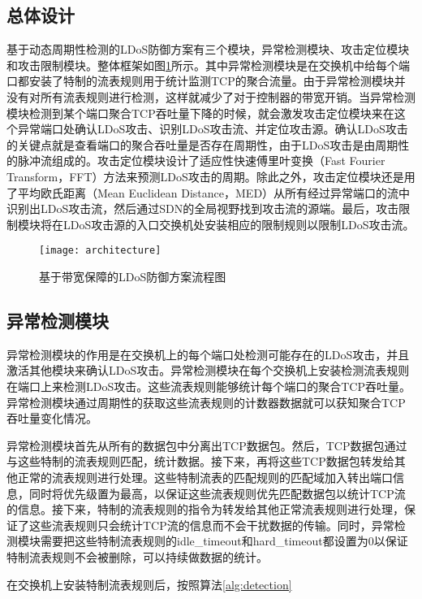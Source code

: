 \subsection{总体设计}
\label{chap4:overview}

基于动态周期性检测的LDoS防御方案有三个模块，异常检测模块、攻击定位模块和攻击限制模块。整体框架如图\ref{fig:architecture}所示。其中异常检测模块是在交换机中给每个端口都安装了特制的流表规则用于统计监测TCP的聚合流量。由于异常检测模块并没有对所有流表规则进行检测，这样就减少了对于控制器的带宽开销。当异常检测模块检测到某个端口聚合TCP吞吐量下降的时候，就会激发攻击定位模块来在这个异常端口处确认LDoS攻击、识别LDoS攻击流、并定位攻击源。确认LDoS攻击的关键点就是查看端口的聚合吞吐量是否存在周期性，由于LDoS攻击是由周期性的脉冲流组成的。攻击定位模块设计了适应性快速傅里叶变换（Fast Fourier Transform，FFT）方法来预测LDoS攻击的周期。除此之外，攻击定位模块还是用了平均欧氏距离（Mean Euclidean Distance，MED）从所有经过异常端口的流中识别出LDoS攻击流，然后通过SDN的全局视野找到攻击流的源端。最后，攻击限制模块将在LDoS攻击源的入口交换机处安装相应的限制规则以限制LDoS攻击流。

\begin{figure}
    \centering
    \texttt{[image: architecture]}
    \caption{基于带宽保障的LDoS防御方案流程图}
    \label{fig:architecture}
\end{figure}

\subsection{异常检测模块}
\label{chap4:Monitor}
异常检测模块的作用是在交换机上的每个端口处检测可能存在的LDoS攻击，并且激活其他模块来确认LDoS攻击。异常检测模块在每个交换机上安装检测流表规则在端口上来检测LDoS攻击。这些流表规则能够统计每个端口的聚合TCP吞吐量。异常检测模块通过周期性的获取这些流表规则的计数器数据就可以获知聚合TCP吞吐量变化情况。

异常检测模块首先从所有的数据包中分离出TCP数据包。然后，TCP数据包通过与这些特制的流表规则匹配，统计数据。接下来，再将这些TCP数据包转发给其他正常的流表规则进行处理。这些特制流表的匹配规则的匹配域加入转出端口信息，同时将优先级置为最高，以保证这些流表规则优先匹配数据包以统计TCP流的信息。接下来，特制的流表规则的指令为转发给其他正常流表规则进行处理，保证了这些流表规则只会统计TCP流的信息而不会干扰数据的传输。同时，异常检测模块需要把这些特制流表规则的idle\_timeout和hard\_timeout都设置为0以保证特制流表规则不会被删除，可以持续做数据的统计。

在交换机上安装特制流表规则后，按照算法\ref{alg:detection}


